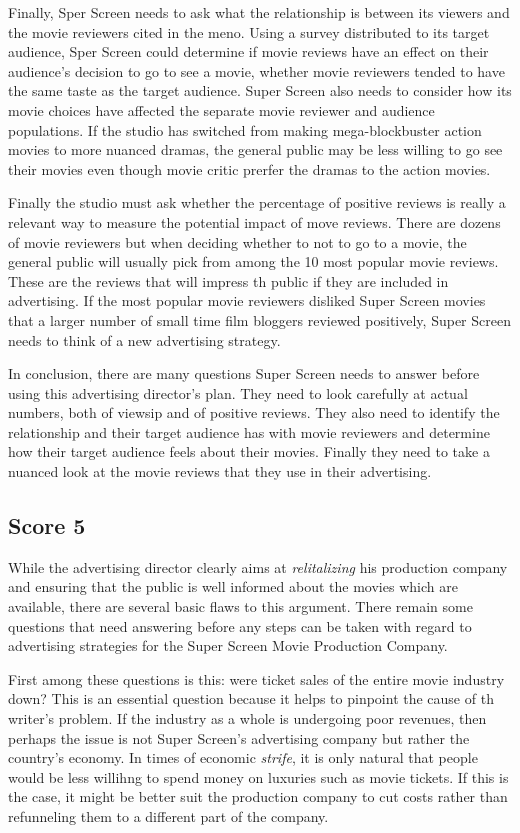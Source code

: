 Finally, Sper Screen needs to ask what the relationship is between its viewers and the movie reviewers cited in the meno.
Using a survey distributed to its target audience, Sper Screen could determine if movie reviews have an effect on their audience's decision to go to see a movie, whether movie reviewers tended to have the same taste as the target audience.
Super Screen also needs to consider how its movie choices have affected the separate movie reviewer and audience populations.
If the studio has switched from making mega-blockbuster action movies to more nuanced dramas, the general public may be less willing to go see their movies even though movie critic prerfer the dramas to the action movies.

Finally the studio must ask whether the percentage of positive reviews is really a relevant way to measure the potential impact of move reviews.
There are dozens of movie reviewers but when deciding whether to not to go to a movie, the general public will usually pick from among the 10 most popular movie reviews.
These are the reviews that will impress th public if they are included in advertising.
If the most popular movie reviewers disliked Super Screen movies that a larger number of small time film bloggers reviewed positively, Super Screen needs to think of a new advertising strategy.

In conclusion, there are many questions Super Screen needs to answer before using this advertising director's plan.
They need to look carefully at actual numbers, both of viewsip and of positive reviews.
They also need to identify the relationship and their target audience has with movie reviewers and determine how their target audience feels about their movies.
Finally they need to take a nuanced look at the movie reviews that they use in their advertising.


\subsection{Score 5}
While the advertising director clearly aims at \emph{relitalizing} his production company and ensuring that the public is well informed about the movies which are available, there are several basic flaws to this argument.
There remain some questions that need answering before any steps can be taken with regard to advertising strategies for the Super Screen Movie Production Company.

First among these questions is this: were ticket sales of the entire movie industry down?
This is an essential question because it helps to pinpoint the cause of th writer's problem.
If the industry as a whole is undergoing poor revenues, then perhaps the issue is not Super Screen's advertising company but rather the country's economy.
In times of economic \emph{strife}, it is only natural that people would be less willihng to spend money on luxuries such as movie tickets.
If this is the case, it might be better suit the production company to cut costs rather than refunneling them to a different part of the company.

